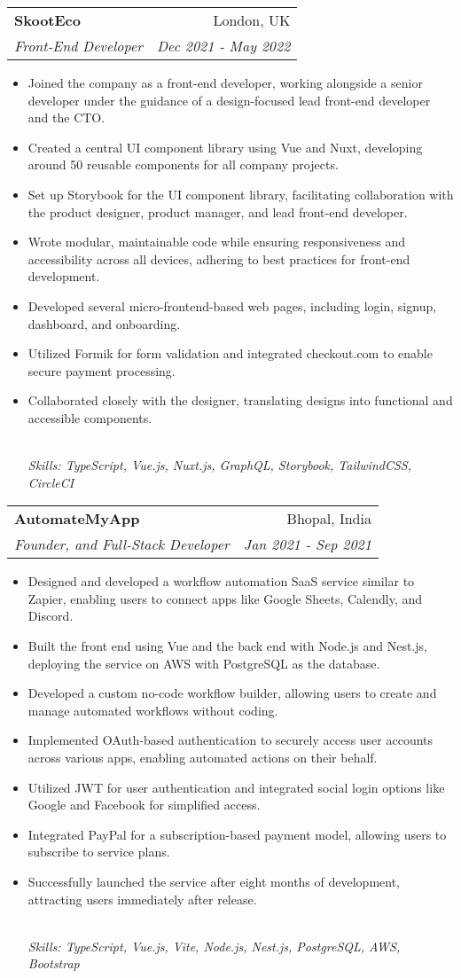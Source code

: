 \documentclass[letterpaper,12pt]{article}
\makeatletter
\newcommand{\resumeItem}[1]{
  \item\small{#1}\vspace{-2pt}
}
\newcommand{\resumeSubheading}[4]{
  \vspace{-2pt}\item
    \begin{tabular*}{0.97\textwidth}[t]{l@{\extracolsep{\fill}}r}
      \textbf{#1} & \small{#2} \\
      \textit{\small{#3}} & \textit{\small{#4}} \\
    \end{tabular*}\vspace{-5pt}
}
\newcommand{\resumeItemFooter}[1]{
    \\ \vspace{7pt}\hspace{-0.35in}\footnotesize\emph{#1}
}
\newcommand{\resumeItemListStart}{\begin{itemize}}
\newcommand{\resumeItemListEnd}{\end{itemize}\vspace{-5pt}}
\def\myHometown{Bhopal, India}
\makeatother
\begin{document}
\resumeSubheading
{SkootEco}{London, UK}
{Front-End Developer}{Dec 2021 - May 2022}
\resumeItemListStart
\resumeItem{Joined the company as a front-end developer, working alongside a senior developer under the guidance of a design-focused lead front-end developer and the CTO.}
\resumeItem{Created a central UI component library using Vue and Nuxt, developing around 50 reusable components for all company projects.}
\resumeItem{Set up Storybook for the UI component library, facilitating collaboration with the product designer, product manager, and lead front-end developer.}
\resumeItem{Wrote modular, maintainable code while ensuring responsiveness and accessibility across all devices, adhering to best practices for front-end development.}
\resumeItem{Developed several micro-frontend-based web pages, including login, signup, dashboard, and onboarding.}
\resumeItem{Utilized Formik for form validation and integrated checkout.com to enable secure payment processing.}
\resumeItem{Collaborated closely with the designer, translating designs into functional and accessible components.}
\resumeItemFooter{Skills: TypeScript, Vue.js, Nuxt.js, GraphQL, Storybook, TailwindCSS, CircleCI}
\resumeItemListEnd

\resumeSubheading
{AutomateMyApp}{\myHometown}
{Founder, and Full-Stack Developer}{Jan 2021 - Sep 2021}
\resumeItemListStart
\resumeItem{Designed and developed a workflow automation SaaS service similar to Zapier, enabling users to connect apps like Google Sheets, Calendly, and Discord.}
\resumeItem{Built the front end using Vue and the back end with Node.js and Nest.js, deploying the service on AWS with PostgreSQL as the database.}
\resumeItem{Developed a custom no-code workflow builder, allowing users to create and manage automated workflows without coding.}
\resumeItem{Implemented OAuth-based authentication to securely access user accounts across various apps, enabling automated actions on their behalf.}
\resumeItem{Utilized JWT for user authentication and integrated social login options like Google and Facebook for simplified access.}
\resumeItem{Integrated PayPal for a subscription-based payment model, allowing users to subscribe to service plans.}
\resumeItem{Successfully launched the service after eight months of development, attracting users immediately after release.}
\resumeItemFooter{Skills: TypeScript, Vue.js, Vite, Node.js, Nest.js, PostgreSQL, AWS, Bootstrap}
\resumeItemListEnd
\end{document}
